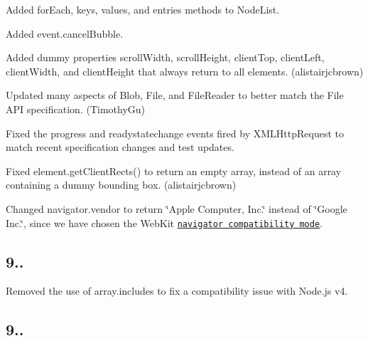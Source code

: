 \begin{DoxyItemize}
\item Added {\ttfamily for\+Each}, {\ttfamily keys}, {\ttfamily values}, and {\ttfamily entries} methods to {\ttfamily Node\+List}.
\item Added {\ttfamily event.\+cancel\+Bubble}.
\item Added dummy properties {\ttfamily scroll\+Width}, {\ttfamily scroll\+Height}, {\ttfamily client\+Top}, {\ttfamily client\+Left}, {\ttfamily client\+Width}, and {\ttfamily client\+Height} that always return {} to all elements. (alistairjcbrown)
\item Updated many aspects of {\ttfamily Blob}, {\ttfamily File}, and {\ttfamily File\+Reader} to better match the File A\+PI specification. (Timothy\+Gu)
\item Fixed the progress and readystatechange events fired by {\ttfamily X\+M\+L\+Http\+Request} to match recent specification changes and test updates.
\item Fixed {\ttfamily element.\+get\+Client\+Rects()} to return an empty array, instead of an array containing a dummy bounding box. (alistairjcbrown)
\item Changed {\ttfamily navigator.\+vendor} to return {\ttfamily \char`\"{}\+Apple Computer, Inc.\char`\"{}} instead of {\ttfamily \char`\"{}\+Google Inc.\char`\"{}}, since we have chosen the Web\+Kit \href{https://html.spec.whatwg.org/multipage/webappapis.html#concept-navigator-compatibility-mode}{\tt navigator compatibility mode}.
\end{DoxyItemize}

\subsection*{9..}


\begin{DoxyItemize}
\item Removed the use of {\ttfamily array.\+includes} to fix a compatibility issue with Node.\+js v4.
\end{DoxyItemize}

\subsection*{9..}



